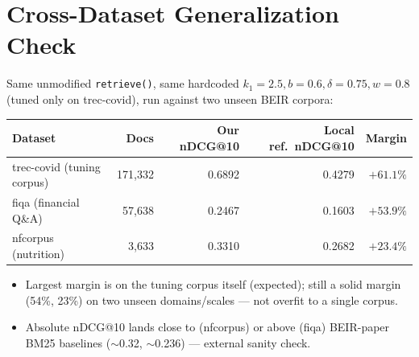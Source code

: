 \documentclass[10pt]{article}
\begin{document}
\section{Cross-Dataset Generalization Check}
Same unmodified \texttt{retrieve()}, same hardcoded $k_1{=}2.5,b{=}0.6,\delta{=}0.75,w{=}0.8$ (tuned only on trec-covid), run against two unseen BEIR corpora:
\begin{table}[h]
\centering\small
\begin{tabular}{lrrrr}
\toprule
Dataset & Docs & Our nDCG@10 & Local ref.\ nDCG@10 & Margin \\
\midrule
trec-covid (tuning corpus) & 171{,}332 & 0.6892 & 0.4279 & $+61.1\%$ \\
fiqa (financial Q\&A) & 57{,}638 & 0.2467 & 0.1603 & $+53.9\%$ \\
nfcorpus (nutrition) & 3{,}633 & 0.3310 & 0.2682 & $+23.4\%$ \\
\bottomrule
\end{tabular}
\end{table}
\begin{itemize}
\item Largest margin is on the tuning corpus itself (expected); still a solid margin (54\%, 23\%) on two unseen domains/scales --- not overfit to a single corpus.
\item Absolute nDCG@10 lands close to (nfcorpus) or above (fiqa) BEIR-paper BM25 baselines ($\sim$0.32, $\sim$0.236) --- external sanity check.
\end{itemize}
\end{document}

